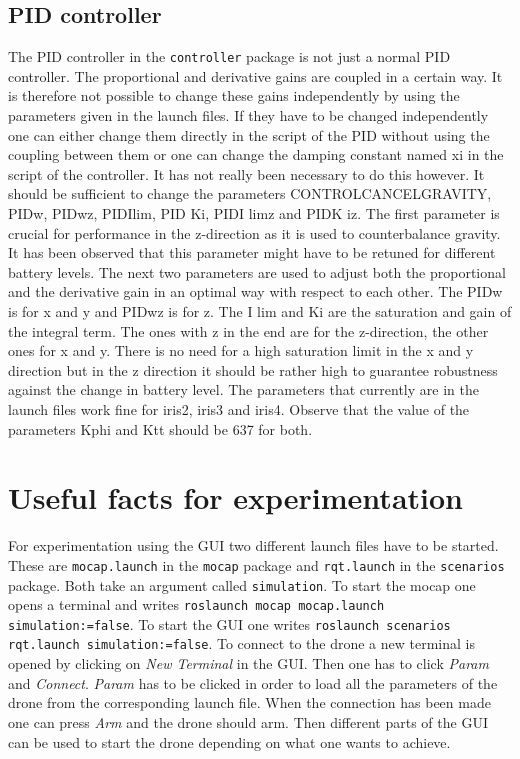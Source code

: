 \documentclass[titlepage,11pt,a4paper]{article}
\begin{document}
\subsection{PID controller}
\label{subsec:pid}
The PID controller in the \texttt{controller} package is not just a
normal PID controller. The proportional and derivative gains are
coupled in a certain way. It is therefore not possible to change these
gains independently by using the parameters given in the launch
files. If they have to be changed independently one can either change
them directly in the script of the PID without using the coupling
between them or one can change the damping constant named
x\textunderscore i in the script of the controller. It has not really
been necessary to do this however.  It should be sufficient to change
the parameters CONTROL\textunderscore CANCEL\textunderscore GRAVITY,
PID\textunderscore w, PID\textunderscore w\textunderscore z,
PID\textunderscore I\textunderscore lim, PID \textunderscore
K\textunderscore i, PID\textunderscore I\textunderscore
lim\textunderscore z and PID\textunderscore K\textunderscore
i\textunderscore z. The first parameter is crucial for performance in
the z-direction as it is used to counterbalance gravity. It has been
observed that this parameter might have to be retuned for different
battery levels. The next two parameters are used to adjust both the
proportional and the derivative gain in an optimal way with respect to
each other. The PID\textunderscore w is for x and y and
PID\textunderscore w\textunderscore z is for z. The I\textunderscore
lim and K\textunderscore i are the saturation and gain of the integral
term. The ones with \textunderscore z in the end are for the
z-direction, the other ones for x and y. There is no need for a high
saturation limit in the x and y direction but in the z direction it
should be rather high to guarantee robustness against the change in
battery level. The parameters that currently are in the launch files
work fine for iris2, iris3 and iris4.  Observe that the value of the
parameters Kphi and Ktt should be 637 for both.

\section{Useful facts for experimentation}
For experimentation using the GUI two different launch files have to
be started. These are \texttt{mocap.launch} in the \texttt{mocap}
package and \texttt{rqt.launch} in the \texttt{scenarios}
package. Both take an argument called \texttt{simulation}. To start
the mocap one opens a terminal and writes \texttt{roslaunch mocap
  mocap.launch simulation:=false}. To start the GUI one writes
\texttt{roslaunch scenarios rqt.launch simulation:=false}. To connect
to the drone a new terminal is opened by clicking on \textit{New
  Terminal} in the GUI. Then one has to click \textit{Param} and
\textit{Connect}. \textit{Param} has to be clicked in order to load
all the parameters of the drone from the corresponding launch
file. When the connection has been made one can press \textit{Arm} and
the drone should arm. Then different parts of the GUI can be used to
start the drone depending on what one wants to achieve.
\end{document}
